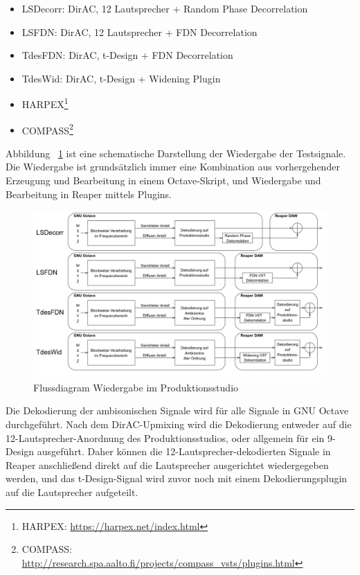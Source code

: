 \begin{itemize}
	\item LSDecorr: DirAC, 12 Lautsprecher + Random Phase Decorrelation
	\item LSFDN: DirAC, 12 Lautsprecher + FDN Decorrelation
	\item TdesFDN: DirAC, t-Design + FDN Decorrelation
	\item TdesWid: DirAC, t-Design + Widening Plugin
	\item HARPEX\footnote{HARPEX: \url{https://harpex.net/index.html}}
	\item COMPASS\footnote{COMPASS: \url{http://research.spa.aalto.fi/projects/compass_vsts/plugins.html}}
\end{itemize}




Abbildung ~\ref{fig:algos} ist eine schematische Darstellung der Wiedergabe der Testsignale. Die Wiedergabe ist grundsätzlich immer eine Kombination aus vorhergehender Erzeugung und Bearbeitung in einem Octave-Skript, und Wiedergabe und Bearbeitung in Reaper mittels Plugins.

\begin{figure}[!ht]
  \centering
  \includegraphics[width=1\textwidth]{aufbau/diagram.png}
  \caption{Flussdiagram Wiedergabe im Produktionsstudio}
  	\label{fig:algos}
\end{figure}

Die Dekodierung der ambisonischen Signale wird für alle Signale in GNU Octave durchgeführt. Nach dem DirAC-Upmixing wird die Dekodierung entweder auf die 12-Lautsprecher-Anordnung des Produktionsstudios, oder allgemein für ein 9-Design ausgeführt. Daher können die 12-Lautsprecher-dekodierten Signale in Reaper anschließend direkt auf die Lautsprecher ausgerichtet wiedergegeben werden, und das t-Design-Signal wird zuvor noch mit einem Dekodierungsplugin auf die Lautsprecher aufgeteilt.

